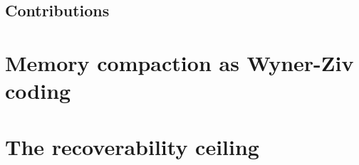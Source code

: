 \documentclass{article}
\begin{document}

\subsection{Contributions}

\section{Memory compaction as Wyner-Ziv coding}
\label{sec:theory}

%
%

\section{The recoverability ceiling}
\label{sec:ceiling}

\end{document}
